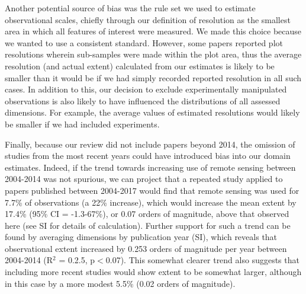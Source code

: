 \documentclass[12pt]{article}
\begin{document}
Another potential source of bias was the rule set we used to estimate observational scales, chiefly through our definition of resolution as the smallest area in which all features of interest were measured. We made this choice because we wanted to use a consistent standard. However, some papers reported plot resolutions wherein sub-samples were made within the plot area, thus the average resolution (and actual extent) calculated from our estimates is likely to be smaller than it would be if we had simply recorded reported resolution in all such cases. In addition to this, our decision to exclude experimentally manipulated observations is also likely to have influenced the distributions of all assessed dimensions. For example, the average values of estimated resolutions would likely be smaller if we had included experiments.  

Finally, because our review did not include papers beyond 2014, the omission of studies from the most recent years could have introduced bias into our domain estimates. Indeed, if the trend towards increasing use of remote sensing between 2004-2014 was not spurious, we can project that a repeated study applied to papers published between 2004-2017 would find that remote sensing was used for 7.7\% of observations (a 22\% increase), which would increase the mean extent by 17.4\% (95\% CI = -1.3-67\%), or 0.07 orders of magnitude, above that observed here (see SI for details of calculation). Further support for such a trend can be found by averaging dimensions by publication year (SI), which reveals that observational extent increased by 0.253 orders of magnitude per year between 2004-2014 (R$^2$ = 0.2.5, p$<$0.07). This somewhat clearer trend also suggests that including more recent studies would show extent to be somewhat larger, although in this case by a more modest 5.5\% (0.02 orders of magnitude).  



\end{document}
